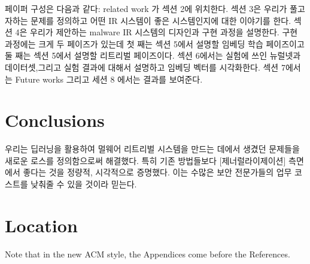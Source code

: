 페이퍼 구성은 다음과 같다: related work 가 섹션 2에 위치한다. 섹션 3은 우리가 풀고자하는 문제를 정의하고 어떤 IR 시스템이 좋은 시스템인지에 대한 이야기를 한다. 섹션 4은 우리가 제안하는 malware IR 시스템의 디자인과 구현 과정을 설명한다. 구현 과정에는 크게 두 페이즈가 있는데 첫 째는 섹션 5에서 설명할 임베딩 학습 페이즈이고 둘 째는 섹션 5에서 설명할 리트리벌 페이즈이다. 섹션 6에서는 실험에 쓰인 뉴럴넷과 데이터셋,그리고 실험 결과에 대해서 설명하고 임베딩 벡터를 시각화한다. 섹션 7에서는 Future works 그리고 세션 8 에서는 결과를 보여준다. 






%








\section{Conclusions}

우리는 딥러닝을 활용하여 멀웨어 리트리벌 시스템을 만드는 데에서 생겼던 문제들을 새로운 로스를 정의함으로써 해결했다. 특히 기존 방법들보다 [제너럴라이제이션] 측면에서 좋다는 것을 정량적, 시각적으로 증명했다. 이는 수많은 보안 전문가들의 업무 코스트를 낮춰줄 수 있을 것이라 믿는다.

\appendix

\section{Location}

Note that in the new ACM style, the Appendices come before the References.


\begin{acks}
\end{acks}
